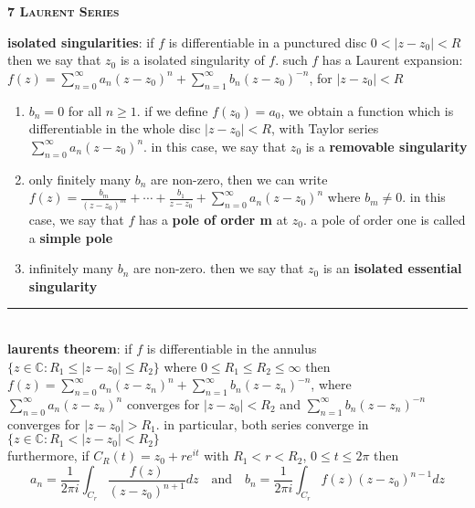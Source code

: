 \documentclass[a4paper]{article}
\newcommand*\abs[1]{\vert #1 \vert}
\newcommand*\linesep[0]{\noindent\rule{\textwidth}{0.5pt}\\}
\begin{document}
\begin{framed}
	\begin{center}
		\textbf{\textsc{7 Laurent Series}}
	\end{center}
	\textbf{isolated singularities}: if $f$ is differentiable in a punctured disc $0 < \abs{z - z_0} < R$ then we say that $z_0$ is a isolated singularity of $f$. such $f$ has a Laurent expansion: $f(z) = \sum_{n = 0}^\infty a_n(z - z_0)^n + \sum_{n = 1}^\infty b_n(z - z_0)^{-n}$, for $\abs{z - z_0} < R$
	
	\begin{enumerate}
		\item $b_n = 0$ for all $n \geq 1$. if we define $f(z_0) = a_0$, we obtain a function which is differentiable in the whole disc $\abs{z - z_0} < R$, with Taylor series $\sum_{n = 0}^\infty a_n (z - z_0)^n$. in this case, we say that $z_0$ is a \textbf{removable singularity}
		\item only finitely many $b_n$ are non-zero, then we can write $f(z) = \frac{b_m}{(z - z_0)^m} + \cdots + \frac{b_1}{z - z_0} + \sum_{n=0}^\infty a_n (z - z_0)^n$ where $b_m \neq 0$. in this case, we say that $f$ has a \textbf{pole of order m} at $z_0$. a pole of order one is called a \textbf{simple pole}
		\item infinitely many $b_n$ are non-zero. then we say that $z_0$ is an \textbf{isolated essential singularity}
	\end{enumerate}
	
	\linesep
	
	\noindent
	\textbf{laurents theorem}: if $f$ is differentiable in the annulus $\{ z \in \mathbb{C} : R_1 \leq \abs{z - z_0} \leq R_2 \}$ where $0 \leq R_1 \leq R_2 \leq \infty$ then $f(z) = \sum_{n=0}^\infty a_n(z - z_n)^n + \sum_{n=1}^\infty b_n(z - z_n)^{-n}$, where $\sum_{n=0}^\infty a_n(z - z_n)^n$ converges for $\abs{z - z_0} < R_2$ and $\sum_{n=1}^\infty b_n(z - z_n)^{-n}$ converges for $\abs{z - z_0} > R_1$. in particular, both series converge in $\{ z \in \mathbb{C} : R_1 < \abs{z - z_0} < R_2 \}$\\
	
	\noindent
	furthermore, if $C_R(t) = z_0 + re^{it}$ with $R_1 < r < R_2$, $0 \leq t \leq 2\pi$ then $$a_n = \frac{1}{2\pi i} \int_{C_r} \frac{f(z)}{(z - z_0)^{n + 1}} dz \quad \text{and} \quad b_n = \frac{1}{2\pi i} \int_{C_r} f(z)(z - z_0)^{n - 1} dz$$
\end{framed}
\end{document}
